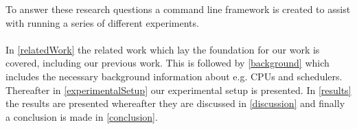 To answer these research questions a command line framework is created to assist with running a series of different experiments.

\paragraph{}
In \cref{relatedWork} the related work which lay the foundation for our work is covered, including our previous work. This is followed by \cref{background} which includes the necessary background information about e.g. CPUs and schedulers. Thereafter in \cref{experimentalSetup} our experimental setup is presented. %
In \cref{results} the results are presented whereafter they are discussed in \cref{discussion} and finally a conclusion is made in \cref{conclusion}. 


